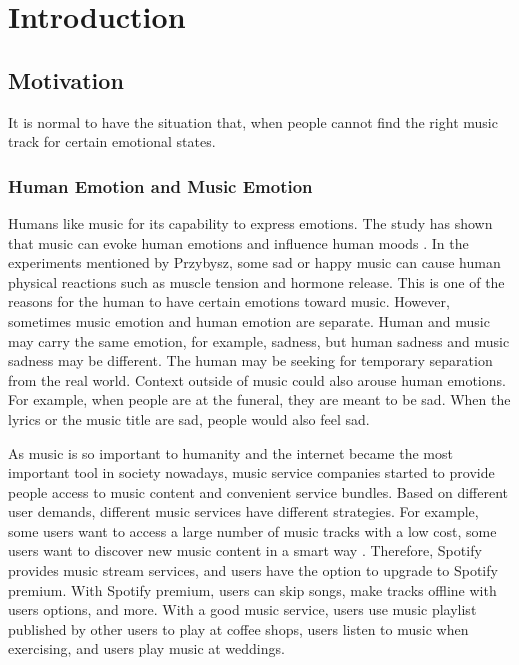 \chapter{Introduction}
\label{ch:intro}

\section{Motivation}
\label{sec:motivation}

It is normal to have the situation that, when people cannot find the right music track for certain emotional states.

\subsection{Human Emotion and Music Emotion}

Humans like music for its capability to express emotions. The study has shown that music can evoke human emotions and influence human moods \cite{Przybysz2013}. In the experiments mentioned by Przybysz, some sad or happy music can cause human physical reactions such as muscle tension and hormone release. This is one of the reasons for the human to have certain emotions toward music. However, sometimes music emotion and human emotion are separate. Human and music may carry the same emotion, for example, sadness, but human sadness and music sadness may be different. The human may be seeking for temporary separation from the real world. Context outside of music could also arouse human emotions. For example, when people are at the funeral, they are meant to be sad. When the lyrics or the music title are sad, people would also feel sad.

As music is so important to humanity and the internet became the most important tool in society nowadays, music service companies started to provide people access to music content and convenient service bundles. Based on different user demands, different music services have different strategies. For example, some users want to access a large number of music tracks with a low cost, some users want to discover new music content in a smart way \cite{palaniappan2018}. Therefore, Spotify provides music stream services, and users have the option to upgrade to Spotify premium. With Spotify premium, users can skip songs, make tracks offline with users options, and more. With a good music service, users use music playlist published by other users to play at coffee shops, users listen to music when exercising, and users play music at weddings.

